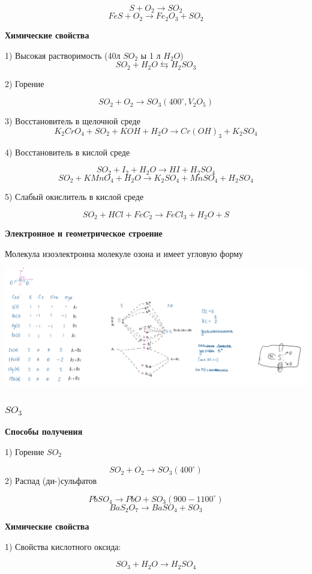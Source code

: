 $$S + O_2 \rightarrow SO_2$$
$$FeS + O_2 \rightarrow Fe_2O_3 + SO_2$$

\textbf{Химические свойства}

1) Высокая растворимость (40л $SO_2$ ы 1 л $H_2O$)
$$SO_2 + H_2O \leftrightarrows H_2SO_3$$

2) Горение

$$SO_2 + O_2 \rightarrow SO_3(400^{\circ},V_2O_5)$$

3) Восстановитель в щелочной среде
$$K_2CrO_4 + SO_2 + KOH + H_2O \rightarrow Cr(OH)_3 + K_2SO_4$$

4) Восстановитель в кислой среде

$$SO_2 + I_2 + H_2O \rightarrow HI + H_2SO_4$$
$$SO_2 + KMnO_4 + H_2O \rightarrow K_2SO_4 + MnSO_4 + H_2SO_4$$

5) Слабый окислитель в кислой среде 

$$SO_2 + HCl + FeC_2 \rightarrow FeCl_3 + H_2O + S$$

\textbf{Электронное и геометрическое строение}

Молекула изоэлектронна молекуле озона и имеет угловую форму

\includegraphics[scale=0.9]{images/7v1.png}

\subsubsection*{$SO_3$}

\textbf{Способы получения}

1) Горение $SO_2$

$$SO_2 + O_2 \rightarrow SO_3 (400^{\circ})$$
2) Распад (ди-)сульфатов

$$PbSO_4 \rightarrow PbO + SO_3 (900-1100^{\circ})$$
$$BaS_2O_7 \rightarrow BaSO_4 + SO_3$$

\textbf{Химические свойства}

1) Свойства кислотного оксида:

$$SO_3 + H_2O \rightarrow H_2SO_4$$

